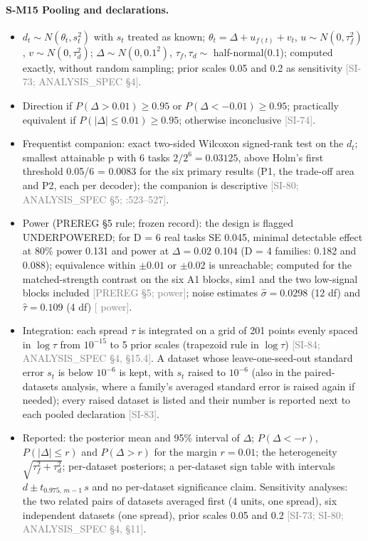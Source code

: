 \documentclass[11pt]{article}
\newcommand{\src}[1]{{\scriptsize\textcolor{gray}{[#1]}}}
\begin{document}
\paragraph{S-M15 Pooling and declarations.}
\begin{itemize}
\item $d_t \sim N(\theta_t, s_t^2)$ with $s_t$ treated as known; $\theta_t = \Delta + u_{f(t)} + v_t$, $u \sim N(0, \tau_f^2)$, $v \sim N(0, \tau_d^2)$; $\Delta \sim N(0, 0.1^2)$, $\tau_f, \tau_d \sim$ half-normal(0.1); computed exactly, without random sampling; prior scales 0.05 and 0.2 as sensitivity \src{SI-73; ANALYSIS\_SPEC \S4}.
\item Direction if $P(\Delta > 0.01) \geq 0.95$ or $P(\Delta < -0.01) \geq 0.95$; practically equivalent if $P(|\Delta| \leq 0.01) \geq 0.95$; otherwise inconclusive \src{SI-74}.
\item Frequentist companion: exact two-sided Wilcoxon signed-rank test on the $d_t$; smallest attainable p with 6 tasks $2/2^6 = 0.03125$, above Holm's first threshold 0.05/6 = 0.0083 for the six primary results (P1, the trade-off area and P2, each per decoder); the companion is descriptive \src{SI-80; ANALYSIS\_SPEC \S5; :523--527}.
\item Power (PREREG \S5 rule; frozen record): the design is flagged UNDERPOWERED; for D = 6 real tasks SE 0.045, minimal detectable effect at 80\% power 0.131 and power at $\Delta = 0.02$ 0.104 (D = 4 families: 0.182 and 0.088); equivalence within $\pm 0.01$ or $\pm 0.02$ is unreachable; computed for the matched-strength contrast on the six A1 blocks, sim1 and the two low-signal blocks included \src{PREREG \S5;  power}; noise estimates $\hat\sigma = 0.0298$ (12 df) and $\hat\tau = 0.109$ (4 df) \src{ power}.
\item Integration: each spread $\tau$ is integrated on a grid of 201 points evenly spaced in $\log\tau$ from $10^{-15}$ to 5 prior scales (trapezoid rule in $\log\tau$) \src{SI-84; ANALYSIS\_SPEC \S4, \S15.4}. A dataset whose leave-one-seed-out standard error $s_t$ is below $10^{-6}$ is kept, with $s_t$ raised to $10^{-6}$ (also in the paired-datasets analysis, where a family's averaged standard error is raised again if needed); every raised dataset is listed and their number is reported next to each pooled declaration \src{SI-83}.
\item Reported: the posterior mean and 95\% interval of $\Delta$; $P(\Delta < -r)$, $P(|\Delta| \leq r)$ and $P(\Delta > r)$ for the margin $r = 0.01$; the heterogeneity $\sqrt{\tau_f^2 + \tau_d^2}$; per-dataset posteriors; a per-dataset sign table with intervals $d \pm t_{0.975,\,m-1}\,s$ and no per-dataset significance claim. Sensitivity analyses: the two related pairs of datasets averaged first (4 units, one spread), six independent datasets (one spread), prior scales 0.05 and 0.2 \src{SI-73; SI-80; ANALYSIS\_SPEC \S4, \S11}.
\end{itemize}
\end{document}
